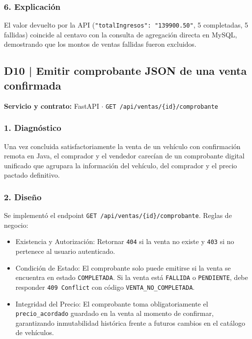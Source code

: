 \documentclass[11pt,a4paper]{article}
\begin{document}
\subsubsection{6. Explicación}
El valor devuelto por la API (\texttt{"totalIngresos": "139900.50"}, 5 completadas, 5 fallidas) coincide al centavo con la consulta de agregación directa en MySQL, demostrando que los montos de ventas fallidas fueron excluidos.

\newpage
\subsection{D10 | Emitir comprobante JSON de una venta confirmada}
\textbf{Servicio y contrato:} FastAPI $\cdot$ \texttt{GET /api/ventas/\{id\}/comprobante}

\subsubsection{1. Diagnóstico}
Una vez concluida satisfactoriamente la venta de un vehículo con confirmación remota en Java, el comprador y el vendedor carecían de un comprobante digital unificado que agrupara la información del vehículo, del comprador y el precio pactado definitivo.

\subsubsection{2. Diseño}
Se implementó el endpoint \texttt{GET /api/ventas/\{id\}/comprobante}. Reglas de negocio:
\begin{itemize}
    \item Existencia y Autorización: Retornar \texttt{404} si la venta no existe y \texttt{403} si no pertenece al usuario autenticado.
    \item Condición de Estado: El comprobante solo puede emitirse si la venta se encuentra en estado \texttt{COMPLETADA}. Si la venta está \texttt{FALLIDA} o \texttt{PENDIENTE}, debe responder \texttt{409 Conflict} con código \texttt{VENTA\_NO\_COMPLETADA}.
    \item Integridad del Precio: El comprobante toma obligatoriamente el \texttt{precio\_acordado} guardado en la venta al momento de confirmar, garantizando inmutabilidad histórica frente a futuros cambios en el catálogo de vehículos.
\end{itemize}
\end{document}
